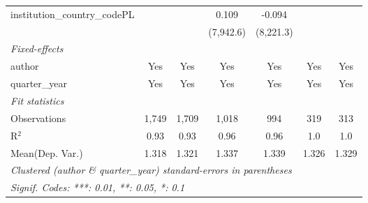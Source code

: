 \begin{tabular}{lcccccc}
   institution\_country\_codePL          &                &                & 0.109         & -0.094        &               &   \\   
                                         &                &                & (7,942.6)     & (8,221.3)     &               &   \\   
   \midrule
   \emph{Fixed-effects}\\
   author                                & Yes            & Yes            & Yes           & Yes           & Yes           & Yes\\  
   quarter\_year                         & Yes            & Yes            & Yes           & Yes           & Yes           & Yes\\  
   \midrule
   \emph{Fit statistics}\\
   Observations                          & 1,749          & 1,709          & 1,018         & 994           & 319           & 313\\  
   R$^2$                                 & 0.93           & 0.93           & 0.96          & 0.96          & 1.0           & 1.0\\  
Mean(Dep. Var.) & 1.318 & 1.321 & 1.337 & 1.339 & 1.326 & 1.329 \\
   \midrule \midrule
   \multicolumn{7}{l}{\emph{Clustered (author \& quarter\_year) standard-errors in parentheses}}\\
   \multicolumn{7}{l}{\emph{Signif. Codes: ***: 0.01, **: 0.05, *: 0.1}}\\
\end{tabular}
\par\endgroup
